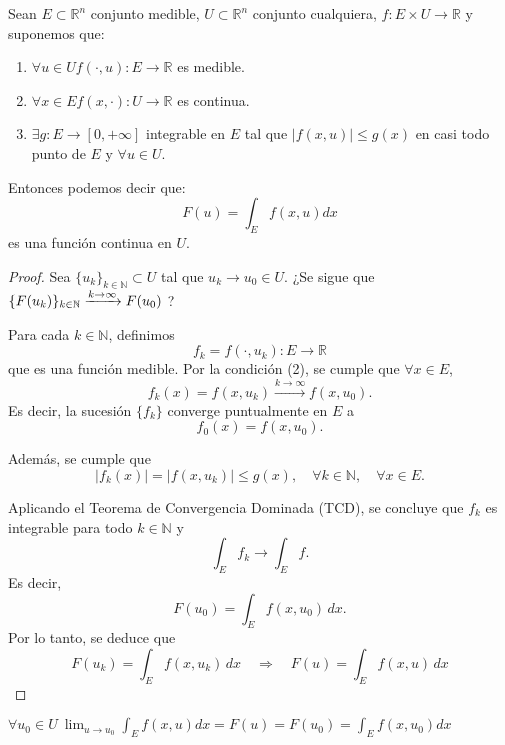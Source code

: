 \begin{teorema}
    Sean $E \subset \mathbb{R}^n$ conjunto medible, $U \subset \mathbb{R}^n$ conjunto cualquiera, $f: E \times U \to \mathbb{R}$ y suponemos que:
    \begin{enumerate}
        \item $\forall u \in U f(\cdot, u): E \to \mathbb{R}$ es medible.
        \item $\forall x \in E f(x, \cdot): U \to \mathbb{R}$ es continua.
        \item $\exists g: E \to [0, +\infty]$ integrable en $E$ tal que $|f(x, u)| \leq g(x)$ en casi todo punto de $E$ y $\forall u \in U$.
    \end{enumerate}
    Entonces podemos decir que:
    $$ F(u) = \int_{E}f(x, u)dx $$ es una función continua en $U$.
\end{teorema}
\begin{proof}
    Sea \( \{ u_k \}_{k \in \mathbb{N}} \subset U \) tal que \( u_k \to u_0 \in U \).
    ¿Se sigue que \( \{ F(u_k) \}_{k \in \mathbb{N}} \xrightarrow{k \to \infty} F(u_0) \) ?

    Para cada \( k \in \mathbb{N} \), definimos
    \[
        f_k = f(\cdot, u_k): E \to \mathbb{R}
    \]
    que es una función medible. Por la condición (2), se cumple que \( \forall x
    \in E \),
    \[
        f_k(x) = f(x, u_k) \xrightarrow{k \to \infty} f(x, u_0).
    \]
    Es decir, la sucesión \( \{ f_k \} \) converge puntualmente en \( E \) a
    \[
        f_0(x) = f(x, u_0).
    \]

    Además, se cumple que
    \[
        |f_k(x)| = |f(x, u_k)| \leq g(x), \quad \forall k \in \mathbb{N}, \quad \forall x \in E.
    \]

    Aplicando el Teorema de Convergencia Dominada (TCD), se concluye que \( f_k \)
    es integrable para todo \( k \in \mathbb{N} \) y
    \[
        \int_E f_k \to \int_E f.
    \]
    Es decir,
    \[
        F(u_0) = \int_E f(x, u_0) \,dx.
    \]
    Por lo tanto, se deduce que
    \[
        F(u_k) = \int_E f(x, u_k) \,dx \quad \Rightarrow \quad F(u) = \int_E f(x, u) \,dx
    \]
\end{proof}
\begin{observación}
$\forall u_0 \in U \ \lim_{u \to u_0} \int_{E}f(x, u)dx = F(u) = F(u_0) = \int_{E}f(x, u_0)dx$
\end{observación}
